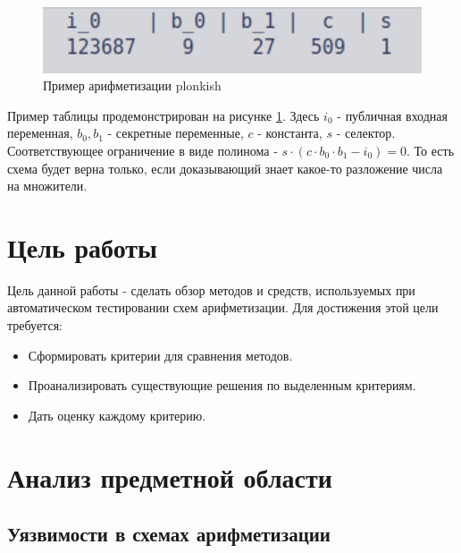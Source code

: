 \documentclass[a4paper]{article}
\begin{document}
\begin{figure}[ht!]
    \includegraphics[width=180mm]{plonkish_example.png}
    \caption{Пример арифметизации plonkish}
    \label{plonkish_example}
    \end{figure}

Пример таблицы продемонстрирован на рисунке \ref{plonkish_example}. Здесь $i_0$ - публичная входная переменная, $b_0, b_1$ - секретные переменные, $c$ - константа, $s$ - селектор. Соответствующее ограничение в виде полинома - $s \cdot (c \cdot b_0 \cdot b_1 - i_0) = 0$. То есть схема будет верна только, если доказывающий знает какое-то разложение числа на множители.

\newpage
\section{Цель работы}
\indent

Цель данной работы - сделать обзор методов и средств, используемых при автоматическом тестировании схем арифметизации. Для достижения этой цели требуется:

\begin{itemize}
\item Сформировать критерии для сравнения методов.
\item Проанализировать существующие решения по выделенным критериям.
\item Дать оценку каждому критерию.
\end{itemize}

\newpage
\section{Анализ предметной области}
\indent

\subsection{Уязвимости в схемах арифметизации}
 
\end{document}
